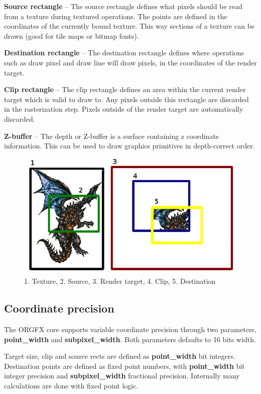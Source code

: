 \documentclass[10pt,a4paper]{article}
\begin{document}
\textbf{Source rectangle} -- The source rectangle defines what pixels should be read from a texture during textured operations. The points are defined in the coordinates of the currently bound texture. This way sections of a texture can be drawn (good for tile maps or bitmap fonts).

\textbf{Destination rectangle} -- The destination rectangle defines where operations such as draw pixel and draw line will draw pixels, in the coordinates of the render target.

\textbf{Clip rectangle} -- The clip rectangle defines an area within the current render target which is valid to draw to. Any pixels outside this rectangle are discarded in the rasterization step. Pixels outside of the render target are automatically discarded.

\textbf{Z-buffer} -- The depth or Z-buffer is a surface containing z coordinate information. This can be used to draw graphics primitives in depth-correct order.

\begin{figure}
\begin{center}
\includegraphics[scale=0.50]{../pictures/SrcClipDest}
\caption{1. Texture, 2. Source, 3. Render target, 4. Clip, 5. Destination}
\label{fig:SrcClipDest}
\end{center}
\end{figure}

\subsection{Coordinate precision}
The ORGFX core supports variable coordinate precision through two parameters, \textbf{point\_width} and \textbf{subpixel\_width}. Both parameters defaults to 16 bits width.

Target size, clip and source rects are defined as \textbf{point\_width} bit integers. Destination points are defined as fixed point numbers, with \textbf{point\_width} bit integer precision and \textbf{subpixel\_width} fractional precision. Internally many calculations are done with fixed point logic.
\end{document}
